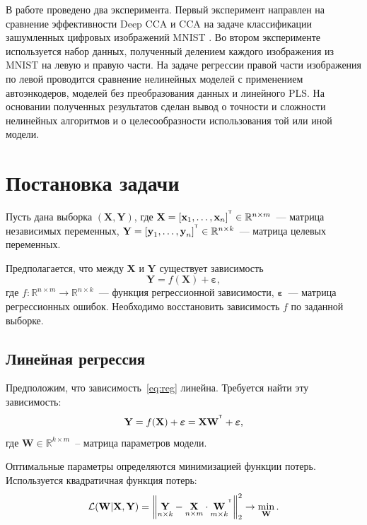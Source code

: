 \documentclass[12pt]{article}
\newcommand{\bY}{\mathbf{Y}}
\newcommand{\bX}{\mathbf{X}}
\newcommand{\bW}{\mathbf{W}}
\newcommand{\T}{^{\text{\tiny\sffamily\upshape\mdseries T}}}
\begin{document}
	В работе проведено два эксперимента. Первый эксперимент направлен на сравнение эффективности Deep CCA и CCA на задаче классификации зашумленных цифровых изображений MNIST \cite{MNIST}. Во втором эксперименте используется набор данных, полученный делением каждого изображения из MNIST на левую и правую части. На задаче регрессии правой части изображения по левой проводится сравнение нелинейных моделей с применением автоэнкодеров, моделей без преобразования данных и линейного PLS. На основании полученных результатов сделан вывод о точности и сложности нелинейных алгоритмов и о целесообразности использования той или иной модели.
	
	\section{Постановка задачи}
	
	Пусть дана выборка $(\bX, \bY)$, где $\textbf{X} = [\textbf{x}_1, \dots, \textbf{x}_{n}]^{\T} \in \mathbb{R}^{n \times m}$~--- матрица независимых переменных, $\textbf{Y} = [\textbf{y}_1, \dots, \textbf{y}_n]^{\T} \in \mathbb{R}^{n \times k}$~--- матрица целевых переменных.
	
	\noindent Предполагается, что между $\bX$ и $\bY$ существует зависимость
	\begin{equation}
		\bY = f(\bX) + \boldsymbol{\varepsilon},
		\label{eq:reg}
	\end{equation}
	где $f: \mathbb{R}^{n \times m} \to \mathbb{R}^{n \times k}$~--- функция регрессионной зависимости, $\boldsymbol{\varepsilon}$~--- матрица регрессионных ошибок.
	Необходимо восстановить зависимость $f$ по заданной выборке.
	
	\subsection{Линейная регрессия}
	Предположим, что зависимость~\eqref{eq:reg} линейна. Требуется найти эту зависимость:
	\begin{equation}
		\bY = f(\bX) + \boldsymbol{\varepsilon}=\bX \bW^{\T} + \boldsymbol{\varepsilon},
		\label{eq:model}
	\end{equation}
	\noindent где $\bW \in \mathbb{R}^{k \times m}$~-- матрица параметров модели.
	
	\noindent Оптимальные параметры определяются минимизацией функции потерь. Используется квадратичная функция потерь:
	\begin{equation}
		\mathcal{L}({\bW} | {\bX}, {\bY}) = {\left\| \underset{n \times k}{\bY}  - \underset{n \times m}{\bX} \cdot \underset{m \times k}{\bW}^{\T} \right\| }_2^2 \rightarrow\min_{\bW}.
		\label{eq:loss_function_2}
	\end{equation}
	
\end{document}
